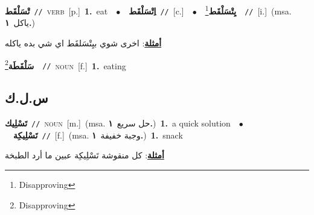 \documentclass[10pt,a4paper,twoside]{article} %
\begin{document}
\begin{multicols}{2}
{\setlength\topsep{0pt}\textbf{\foreignlanguage{arabic}{تْسَلْقَط}}\ {\color{gray}\texttt{//}\color{black}}\ \textsc{verb}\ [p.]\ \textbf{1.}~eat\ \ $\bullet$\ \ \setlength\topsep{0pt}\textbf{\foreignlanguage{arabic}{اِتْسَلْقَط}}\ {\color{gray}\texttt{//}\color{black}}\ [c.]\ \ $\bullet$\ \ \setlength\topsep{0pt}\textbf{\foreignlanguage{arabic}{يِتْسَلْقَط}}\footnote{Disapproving}\ \ {\color{gray}\texttt{//}\color{black}}\ [i.]\ \color{gray}(msa. \foreignlanguage{arabic}{ياكل}~\foreignlanguage{arabic}{\textbf{١.}})\color{black}\  \begin{flushright}\color{gray}\foreignlanguage{arabic}{\textbf{\underline{\foreignlanguage{arabic}{أمثلة}}}: اخرى شوي بيِتْسَلقَط اي شي بده ياكله}\end{flushright}\color{black}} \vspace{2mm}

{\setlength\topsep{0pt}\textbf{\foreignlanguage{arabic}{سَلْقَطَة}}\footnote{Disapproving}\ \ {\color{gray}\texttt{//}\color{black}}\ \textsc{noun}\ [f.]\ \textbf{1.}~eating\ } \vspace{2mm}

\vspace{-3mm}
\subsection*{\color{blue}\foreignlanguage{arabic}{س.ل.ك}\color{blue}{}} 

{\setlength\topsep{0pt}\textbf{\foreignlanguage{arabic}{تَسْلِيك}}\ {\color{gray}\texttt{//}\color{black}}\ \textsc{noun}\ [m.]\ \color{gray}(msa. \foreignlanguage{arabic}{حل سريع}~\foreignlanguage{arabic}{\textbf{١.}})\color{black}\ \textbf{1.}~a quick solution\ \ $\bullet$\ \ \setlength\topsep{0pt}\textbf{\foreignlanguage{arabic}{تَسْلِيكِة}}\ {\color{gray}\texttt{//}\color{black}}\ [f.]\ \color{gray}(msa. \foreignlanguage{arabic}{وجبة خفيفة}~\foreignlanguage{arabic}{\textbf{١.}})\color{black}\ \textbf{1.}~snack\  \begin{flushright}\color{gray}\foreignlanguage{arabic}{\textbf{\underline{\foreignlanguage{arabic}{أمثلة}}}: كل منقوشة تَسْلِيكِة عبين ما أرد الطبخة}\end{flushright}\color{black}} \vspace{2mm}


\end{multicols}
\end{document}
